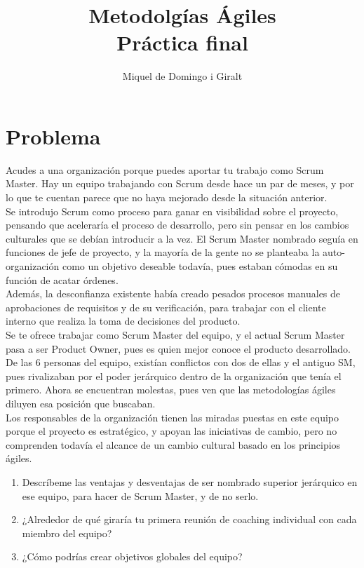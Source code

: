 \documentclass[a4paper, 11pt, oneside]{article}
\date{}
\title{
\textbf{\huge Metodolgías Ágiles}
\\[8pt]
{Práctica final}
}
\author{Miquel de Domingo i Giralt}
\begin{document}
\maketitle
\newpage
\section{Problema}
Acudes a una organización porque puedes aportar tu trabajo como Scrum Master.
Hay un equipo trabajando con Scrum desde hace un par de meses, y por lo que te
cuentan parece que no haya mejorado desde la situación anterior.
\\[8pt]
Se introdujo Scrum como proceso para ganar en visibilidad sobre el proyecto,
pensando que aceleraría el proceso de desarrollo, pero sin pensar en los cambios
culturales que se debían introducir a la vez. El Scrum Master nombrado seguía en
funciones de jefe de proyecto, y la mayoría de la gente no se planteaba la
auto-organización como un objetivo deseable todavía, pues estaban cómodas en su
función de acatar órdenes.
\\[8pt]
Además, la desconfianza existente había creado pesados procesos manuales de
aprobaciones de requisitos y de su verificación, para trabajar con el cliente
interno que realiza la toma de decisiones del producto.
\\[8pt]
Se te ofrece trabajar como Scrum Master del equipo, y el actual Scrum Master
pasa a ser Product Owner, pues es quien mejor conoce el producto desarrollado.
\\[8pt]
De las 6 personas del equipo, existían conflictos con dos de ellas y el antiguo
SM, pues rivalizaban por el poder jerárquico dentro de la organización que tenía
el primero. Ahora se encuentran molestas, pues ven que las metodologías ágiles
diluyen esa posición que buscaban.
\\[8pt]
Los responsables de la organización tienen las miradas puestas en este equipo
porque el proyecto es estratégico, y apoyan las iniciativas de cambio, pero no
comprenden todavía el alcance de un cambio cultural basado en los principios
ágiles.
\begin{enumerate}
	\item Descríbeme las ventajas y desventajas de ser nombrado superior
	      jerárquico en ese equipo, para hacer de Scrum Master, y de no serlo.
	\item ¿Alrededor de qué giraría tu primera reunión de coaching individual
	      con cada miembro del equipo?
	\item ¿Cómo podrías crear objetivos globales del equipo?
\end{enumerate}
\newpage
\end{document}

